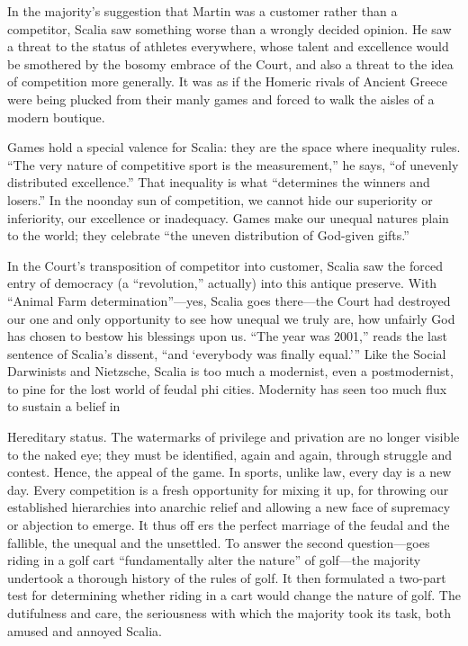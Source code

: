 In the majority’s suggestion that Martin was a customer rather than a competitor, Scalia saw something worse than a wrongly decided opinion. He saw a threat to the status of athletes everywhere, whose talent and excellence would be smothered by the bosomy embrace of the Court, and also a threat to the idea of competition more generally. It was as if the Homeric rivals of Ancient Greece were being plucked from their manly games and forced to walk the aisles of a modern boutique.
 \par 
Games hold a special valence for Scalia: they are the space where inequality rules. “The very nature of competitive sport is the measurement,” he says, “of unevenly distributed excellence.” That inequality is what “determines the winners and losers.” In the noonday sun of competition, we cannot hide our superiority or inferiority, our excellence or inadequacy. Games make our unequal natures plain to the world; they celebrate “the uneven distribution of God-given gifts.”
 \par 
In the Court’s transposition of competitor into customer, Scalia saw the forced entry of democracy (a “revolution,” actually) into this antique preserve. With “Animal Farm determination”—yes, Scalia goes there—the Court had destroyed our one and only opportunity to see how unequal we truly are, how unfairly God has chosen to bestow his blessings upon us. “The year was 2001,” reads the last sentence of Scalia’s dissent, “and ‘everybody was finally equal.’” Like the Social Darwinists and Nietzsche, Scalia is too much a modernist, even a postmodernist, to pine for the lost world of feudal phi cities. Modernity has seen too much flux to sustain a belief in
 \par 
Hereditary status. The watermarks of privilege and privation are no longer visible to the naked eye; they must be identified, again and again, through struggle and contest. Hence, the appeal of the game. In sports, unlike law, every day is a new day. Every competition is a fresh opportunity for mixing it up, for throwing our established hierarchies into anarchic relief and allowing a new face of supremacy or abjection to emerge. It thus off ers the perfect marriage of the feudal and the fallible, the unequal and the unsettled. To answer the second question—goes riding in a golf cart “fundamentally alter the nature” of golf—the majority undertook a thorough history of the rules of golf. It then formulated a two-part test for determining whether riding in a cart would change the nature of golf. The dutifulness and care, the seriousness with which the majority took its task, both amused and annoyed Scalia.
